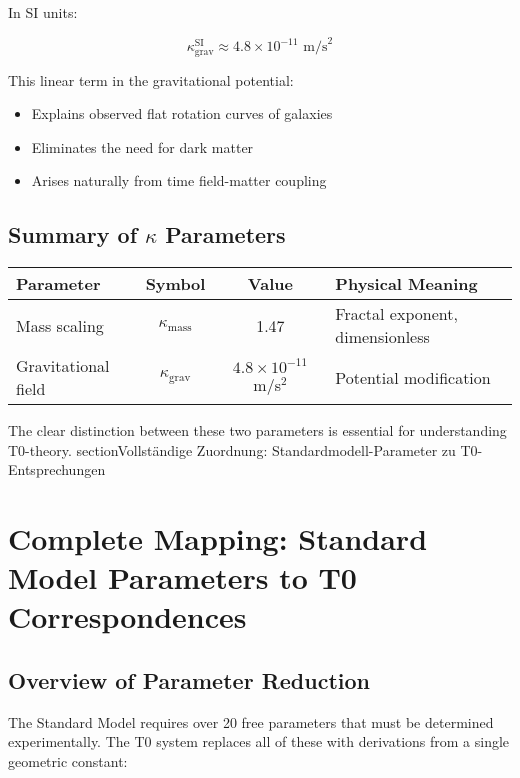\documentclass[12pt,a4paper]{article}
\begin{document}
	In SI units:
	
	\begin{equation}
		\kappa_{\text{grav}}^{\text{SI}} \approx 4.8 \times 10^{-11} \text{ m/s}^2
	\end{equation}
	
	This linear term in the gravitational potential:
	\begin{itemize}
		\item Explains observed flat rotation curves of galaxies
		\item Eliminates the need for dark matter
		\item Arises naturally from time field-matter coupling
	\end{itemize}
	
	\subsection{Summary of $\kappa$ Parameters}
	
	\begin{center}
		\begin{tabular}{|l|c|c|l|}
			\hline
			\textbf{Parameter} & \textbf{Symbol} & \textbf{Value} & \textbf{Physical Meaning} \\
			\hline
			Mass scaling & $\kappa_{\text{mass}}$ & 1.47 & Fractal exponent, dimensionless \\
			Gravitational field & $\kappa_{\text{grav}}$ & $4.8 \times 10^{-11}$ m/s$^2$ & Potential modification \\
			\hline
		\end{tabular}
	\end{center}
	
	The clear distinction between these two parameters is essential for understanding T0-theory.
section{Vollständige Zuordnung: Standardmodell-Parameter zu T0-Entsprechungen}
\label{sec:sm_t0_mapping}



\section{Complete Mapping: Standard Model Parameters to T0 Correspondences}
\label{sec:sm_t0_mapping}

\subsection{Overview of Parameter Reduction}
\label{subsec:parameter_overview}

The Standard Model requires over 20 free parameters that must be determined experimentally. The T0 system replaces all of these with derivations from a single geometric constant:
\end{document}
